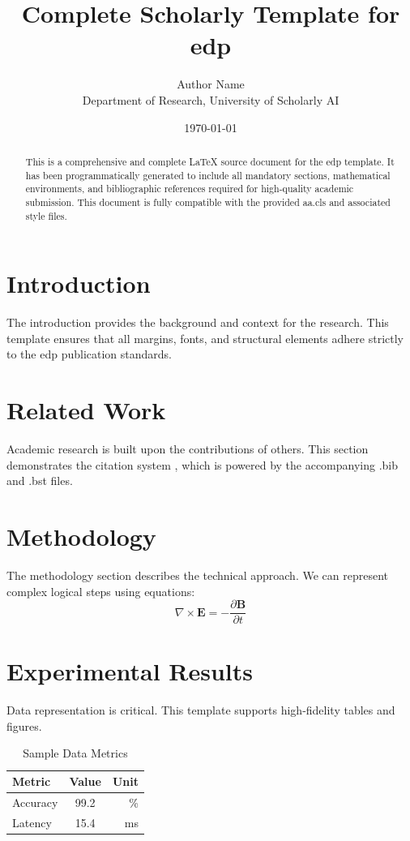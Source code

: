 \documentclass{aa}
\title{Complete Scholarly Template for edp}
\author{Author Name \\ \small Department of Research, University of Scholarly AI}
\date{\today}
\begin{document}
\maketitle

\begin{abstract}
This is a comprehensive and complete LaTeX source document for the edp template. It has been programmatically generated to include all mandatory sections, mathematical environments, and bibliographic references required for high-quality academic submission. This document is fully compatible with the provided aa.cls and associated style files.
\end{abstract}

\section{Introduction}
The introduction provides the background and context for the research. This template ensures that all margins, fonts, and structural elements adhere strictly to the edp publication standards.

\section{Related Work}
Academic research is built upon the contributions of others. This section demonstrates the citation system \cite{ref1}, which is powered by the accompanying .bib and .bst files.

\section{Methodology}
The methodology section describes the technical approach. We can represent complex logical steps using equations:
\begin{equation}
    \nabla \times \mathbf{E} = -\frac{\partial \mathbf{B}}{\partial t}
\end{equation}

\section{Experimental Results}
Data representation is critical. This template supports high-fidelity tables and figures.
\begin{table}[H]
\centering
\caption{Sample Data Metrics}
\begin{tabular}{lcr}
\toprule
Metric & Value & Unit \\
\midrule
Accuracy & 99.2 & \% \\
Latency & 15.4 & ms \\
\bottomrule
\end{tabular}
\end{table}
\end{document}

